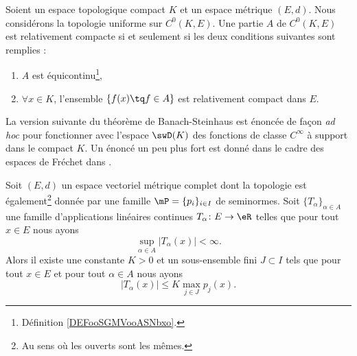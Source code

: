 \begin{theorem}        \label{ThoKRbtpah}
	Soient un espace topologique compact \( K\) et un espace métrique \( (E,d)\). Nous considérons la topologie uniforme sur \( C^0(K,E)\). Une partie \( A\) de \( C^0(K,E)\) est relativement compacte si et seulement si les deux conditions suivantes sont remplies :
	\begin{enumerate}
		\item
		      \( A\) est équicontinu\footnote{Définition \ref{DEFooSGMVooASNbxo}.},
		\item
		      \( \forall x\in K\), l'ensemble \( \{ f(x)\tq f\in A \}\) est relativement compact dans \( E\).
	\end{enumerate}
\end{theorem}

La version suivante du théorème de Banach-Steinhaus est énoncée de façon \emph{ad hoc} pour fonctionner avec l'espace \( \swD(K)\) des fonctions de classe \(  C^{\infty}\) à support dans le compact \( K\). Un énoncé un peu plus fort est donné dans le cadre des espaces de Fréchet dans \cite{TQSWRiz}.
\begin{theorem}  \label{ThoNBrmGIg}
	Soit \( (E,d)\) un espace vectoriel métrique complet dont la topologie est également\footnote{Au sens où les ouverts sont les mêmes.} donnée par une famille \( \mP=\{ p_i \}_{i\in I}\) de seminormes. Soit \( \{ T_{\alpha} \}_{\alpha\in A}\) une famille d'applications linéaires continues \( T_{\alpha}\colon E\to \eR\) telles que pour tout \( x\in E\) nous ayons
	\begin{equation}
		\sup_{\alpha\in A}\big| T_{\alpha}(x) \big|<\infty.
	\end{equation}
	Alors il existe une constante \( K>0\) et un sous-ensemble fini \( J\subset I\) tels que pour tout \( x\in E\) et pour tout \( \alpha\in A\) nous ayons
	\begin{equation}    \label{EqIFNGhtr}
		\big| T_{\alpha} (x)\big|\leq K\max_{j\in J}p_j(x).
	\end{equation}
\end{theorem}

